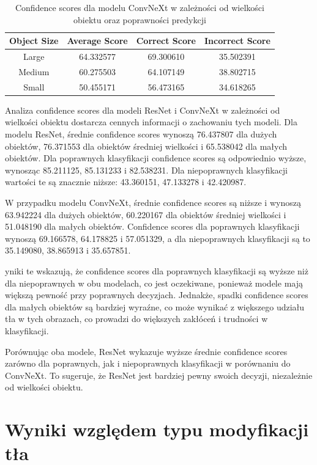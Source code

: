 \begin{table}
	\centering
	\begin{tabular}{|c|c|c|c|}
		\hline
		\textbf{Object Size} & \textbf{Average Score} & \textbf{Correct Score} & \textbf{Incorrect Score} \\
		\hline
		Large & 64.332577 & 69.300610 & 35.502391 \\
		\hline
		Medium & 60.275503 & 64.107149 & 38.802715 \\
		\hline
		Small & 50.455171 & 56.473165 & 34.618265 \\
		\hline
	\end{tabular}
	\caption{Confidence scores dla modelu ConvNeXt w zależności od wielkości obiektu oraz poprawności predykcji}
	\label{tab:convnext_confidence_scores}
\end{table}

Analiza confidence scores dla modeli ResNet i ConvNeXt w zależności od wielkości obiektu dostarcza cennych informacji o zachowaniu tych modeli. 
Dla modelu ResNet, średnie confidence scores wynoszą 76.437807 dla dużych obiektów, 76.371553 dla obiektów średniej wielkości i 65.538042 dla 
małych obiektów. Dla poprawnych klasyfikacji confidence scores są odpowiednio wyższe, wynosząc 85.211125, 85.131233 i 82.538231. Dla niepoprawnych 
klasyfikacji wartości te są znacznie niższe: 43.360151, 47.133278 i 42.420987.

W przypadku modelu ConvNeXt, średnie confidence scores są niższe i wynoszą 63.942224 dla dużych obiektów, 60.220167 dla obiektów średniej 
wielkości i 51.048190 dla małych obiektów. Confidence scores dla poprawnych klasyfikacji wynoszą 69.166578, 64.178825 i 57.051329, a dla 
niepoprawnych klasyfikacji są to 35.149080, 38.865913 i 35.657851.

yniki te wskazują, że confidence scores dla poprawnych klasyfikacji są wyższe niż dla niepoprawnych w obu modelach, co jest oczekiwane, 
ponieważ modele mają większą pewność przy poprawnych decyzjach. Jednakże, spadki confidence scores dla małych obiektów są bardziej wyraźne, 
co może wynikać z większego udziału tła w tych obrazach, co prowadzi do większych zakłóceń i trudności w klasyfikacji.

Porównując oba modele, ResNet wykazuje wyższe średnie confidence scores zarówno dla poprawnych, jak i niepoprawnych klasyfikacji w porównaniu 
do ConvNeXt. To sugeruje, że ResNet jest bardziej pewny swoich decyzji, niezależnie od wielkości obiektu.

\section*{Wyniki względem typu modyfikacji tła}


